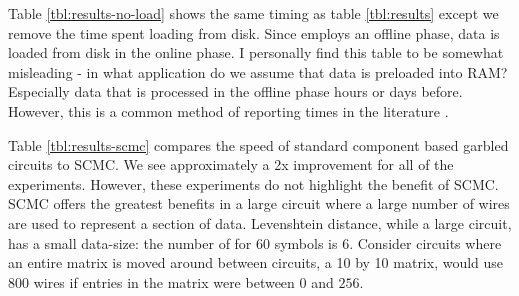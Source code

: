 Table \ref{tbl:results-no-load} shows the same timing as table \ref{tbl:results} except we remove the time spent loading from disk.
Since \CompGC employs an offline phase, data is loaded from disk in the online phase. 
I personally find this table to be somewhat misleading - in what application do we assume that data is preloaded into RAM?
Especially data that is processed in the offline phase hours or days before.
However, this is a common method of reporting times in the literature \cite{blazing-fast} .

Table \ref{tbl:results-scmc} compares the speed of standard component based garbled circuits to SCMC.
We see approximately a 2x improvement for all of the experiments. 
However, these experiments do not highlight the benefit of SCMC. 
SCMC offers the greatest benefits in a large circuit where a large number of wires are used to represent a section of data.
Levenshtein distance, while a large circuit, has a small data-size: the number of for 60 symbols is 6.
Consider circuits where an entire matrix is moved around between circuits, a 10 by 10 matrix, would use $800$ wires if entries in the matrix were between $0$ and $256$.


\newpage



\newpage


